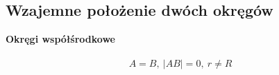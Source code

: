 \documentclass[14pt,a4paper]{extarticle}
\begin{document}
\subsection{Wzajemne położenie dwóch okręgów}
\hfill\break
\noindent \textbf{Okręgi współśrodkowe}
\hfill\break\\\\
$$A = B,\: \vert AB\vert = 0,\:r \neq R$$
\hfill\break\\\\\\
\MoveBelowBox\unskip
\end{document}
